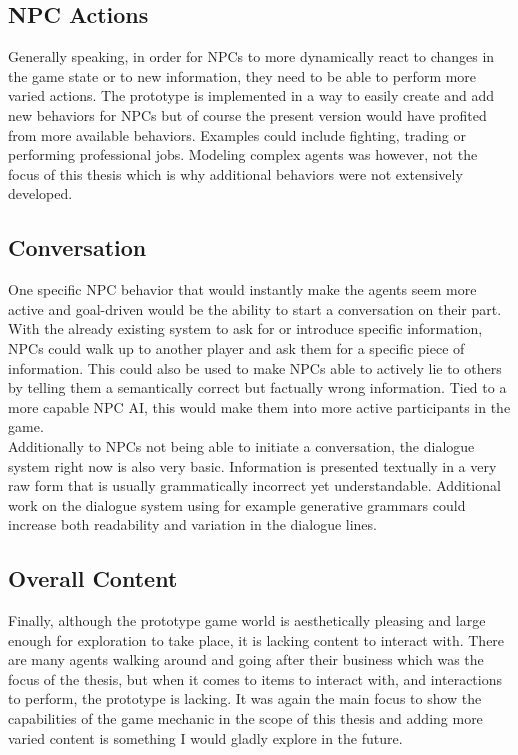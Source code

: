 \subsection{NPC Actions}
Generally speaking, in order for NPCs to more dynamically react to changes in the game state or to new information, they need to be able to perform more varied actions. The prototype is implemented in a way to easily create and add new behaviors for NPCs but of course the present version would have profited from more available behaviors. Examples could include fighting, trading or performing professional jobs. Modeling complex agents was however, not the focus of this thesis which is why additional behaviors were not extensively developed.
\subsection{Conversation}
One specific NPC behavior that would instantly make the agents seem more active and goal-driven would be the ability to start a conversation on their part. With the already existing system to ask for or introduce specific information, NPCs could walk up to another player and ask them for a specific piece of information. This could also be used to make NPCs able to actively lie to others by telling them a semantically correct but factually wrong information. Tied to a more capable NPC AI, this would make them into more active participants in the game.\\
Additionally to NPCs not being able to initiate a conversation, the dialogue system right now is also very basic. Information is presented textually in a very raw form that is usually grammatically incorrect yet understandable. Additional work on the dialogue system using for example generative grammars could increase both readability and variation in the dialogue lines.
\subsection{Overall Content}
Finally, although the prototype game world is aesthetically pleasing and large enough for exploration to take place, it is lacking content to interact with. There are many agents walking around and going after their business which was the focus of the thesis, but when it comes to items to interact with, and interactions to perform, the prototype is lacking. It was again the main focus to show the capabilities of the game mechanic in the scope of this thesis and adding more varied content is something I would gladly explore in the future.
